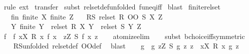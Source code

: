 \begin{isabellebody}
%
\isadelimproof
%
\endisadelimproof
%
\isatagproof
{}\isamarkupfalse%
\ {\isacharparenleft}rule\ ext{\isacharparenright}{\isacharplus}\isanewline
{}\isamarkupfalse%
\ transfer{\isacharprime}\isanewline
{}\isamarkupfalse%
\ {\isacharparenleft}subst\ rel{\isacharunderscore}set{\isacharunderscore}def{\isacharbrackleft}unfolded\ fun{\isacharunderscore}eq{\isacharunderscore}iff{\isacharbrackright}{\isacharparenright}\isanewline
{}\isamarkupfalse%
\ blast%
\endisatagproof
{\isafoldproof}%
%
\isadelimproof
\isanewline
%
\endisadelimproof
\isanewline
{}\isamarkupfalse%
\ finite{\isacharunderscore}rel{\isacharunderscore}set{\isacharcolon}\isanewline
\ \ \ fin{\isacharcolon}\ {\isachardoublequoteopen}finite\ X{\isachardoublequoteclose}\ {\isachardoublequoteopen}finite\ Z{\isachardoublequoteclose}\isanewline
\ \ \ R{\isacharunderscore}S{\isacharcolon}\ {\isachardoublequoteopen}rel{\isacharunderscore}set\ {\isacharparenleft}R\ OO\ S{\isacharparenright}\ X\ Z{\isachardoublequoteclose}\isanewline
\ \ \ {\isachardoublequoteopen}{\isasymexists}Y{\isachardot}\ finite\ Y\ {\isasymand}\ rel{\isacharunderscore}set\ R\ X\ Y\ {\isasymand}\ rel{\isacharunderscore}set\ S\ Y\ Z{\isachardoublequoteclose}\isanewline
%
\isadelimproof
%
\endisadelimproof
%
\isatagproof
{}\isamarkupfalse%
\ {\isacharminus}\isanewline
\ \ \isamarkupfalse%
\ f\ \ f{\isacharcolon}\ {\isachardoublequoteopen}{\isasymforall}x{\isasymin}X{\isachardot}\ R\ x\ {\isacharparenleft}f\ x{\isacharparenright}\ {\isasymand}\ {\isacharparenleft}{\isasymexists}z{\isasymin}Z{\isachardot}\ S\ {\isacharparenleft}f\ x{\isacharparenright}\ z{\isacharparenright}{\isachardoublequoteclose}\isanewline
\ \ \isamarkupfalse%
\ atomize{\isacharunderscore}elim\isanewline
\ \ \isamarkupfalse%
\ {\isacharparenleft}subst\ bchoice{\isacharunderscore}iff{\isacharbrackleft}symmetric{\isacharbrackright}{\isacharparenright}\isanewline
\ \ \isamarkupfalse%
\ R{\isacharunderscore}S{\isacharbrackleft}unfolded\ rel{\isacharunderscore}set{\isacharunderscore}def\ OO{\isacharunderscore}def{\isacharbrackright}\ \isamarkupfalse%
\ blast\isanewline
\isanewline
\ \ \isamarkupfalse%
\ g\ \ g{\isacharcolon}\ {\isachardoublequoteopen}{\isasymforall}z{\isasymin}Z{\isachardot}\ S\ {\isacharparenleft}g\ z{\isacharparenright}\ z\ {\isasymand}\ {\isacharparenleft}{\isasymexists}x{\isasymin}X{\isachardot}\ R\ x\ {\isacharparenleft}g\ z{\isacharparenright}{\isacharparenright}{\isachardoublequoteclose}\isanewline

\end{isabellebody}
